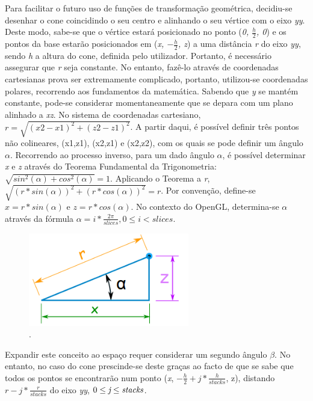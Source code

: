 \documentclass[a4paper]{article}
\begin{document}
\hspace{3mm} Para facilitar o futuro uso de funções de transformação geométrica, decidiu-se desenhar o cone coincidindo o seu centro e alinhando o seu vértice com o eixo \emph{yy}. Deste modo, sabe-se que o vértice estará posicionado no ponto (\emph{0, \( \frac{h}{2} \), 0}) e os pontos da base estarão posicionados em (\emph{x, \( -\frac{h}{2} \), z}) a uma distância \emph{r} do eixo \emph{yy}, sendo \emph{h} a altura do cone, definida pelo utilizador. Portanto, é necessário assegurar que \emph{r} seja constante. No entanto, fazê-lo através de coordenadas cartesianas prova ser extremamente complicado, portanto, utilizou-se coordenadas polares, recorrendo aos fundamentos da matemática. Sabendo que \emph{y} se mantém constante, pode-se considerar momentaneamente que se depara com um plano alinhado a \emph{xz}. No sistema de coordenadas cartesiano, $r = \sqrt{(x2 - x1)^2 + (z2 - z1)^2}$. A partir daqui, é possível definir três pontos não colineares, (x1,z1), (x2,z1) e (x2,z2), com os quais se pode definir um ângulo $\alpha$. Recorrendo ao processo inverso, para um dado ângulo $\alpha$, é possível determinar \emph{x} e \emph{z} através do Teorema Fundamental da Trigonometria: $\sqrt{sin^2(\alpha) + cos^2(\alpha)} = 1$. Aplicando o Teorema a \emph{r}, $\sqrt{(r*sin(\alpha))^2 + (r*cos(\alpha))^2} = r$. Por convenção, define-se $x = r*sin(\alpha)$ e $z = r*cos(\alpha)$. No contexto do OpenGL, determina-se $\alpha$ através da fórmula $\alpha = i * \frac{2\pi}{slices}, 0 \leq i < slices$.

\begin{figure}[h!]
\centering
\includegraphics[width=7cm]{./imagens/coordinates-triangle.png}
\caption{.}
\label{fig:cp_triangle}
\end{figure}

\hspace{3mm} Expandir este conceito ao espaço requer considerar um segundo ângulo $\beta$. No entanto, no caso do cone prescinde-se deste graças ao facto de que se sabe que todos os pontos se encontrarão num ponto (\emph{x}, $ -\frac{h}{2} + j * \frac{h}{stacks}$, z), distando $r - j * \frac{r}{stacks}$ do eixo \emph{yy}, $0 \leq \emph{j} \leq \emph{stacks}$. 
\end{document}
